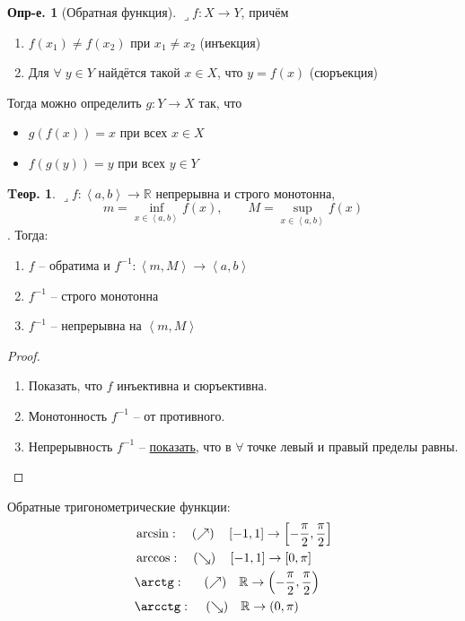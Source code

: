\documentclass[a4paper,12pt]{article}
\numberwithin{figure}{section}
\theoremstyle{definition}
\newtheorem{definition}{Опр-е.}[section]
\newtheorem{theorem}{Tеор.}[section]
\def\DS{\displaystyle}
\def\RR{\mathbb{R}}
\def\on{\!:}
\def\intab{\left<a,b\right>}
\def\lets{{\huge$\lrcorner$}\space}
\def\any{$\forall\;$}
\begin{document}
\begin{definition}[Обратная функция]
	\lets $f\on X\to Y$, причём\begin{enumerate}
		\item $f(x_1)\ne f(x_2)$ при $x_1\ne x_2$ (инъекция)
		\item Для \any $y\in Y$ найдётся такой $x\in X$, что $y=f(x)$ (сюръекция)
	\end{enumerate}
	Тогда можно определить $g\on Y\to X$ так, что\begin{itemize}
		\item $g(f(x))=x$ при всех $x\in X$
		\item $f(g(y))=y$ при всех $y\in Y$
	\end{itemize}
\end{definition}

\begin{theorem}
	\lets $f\on \intab\to\RR$ непрерывна и строго монотонна,
	\[ \DS m=\inf_{x \in \intab}f(x) ,\qquad \DS M=\sup_{x \in \intab}f(x)\].
	Тогда:
	\begin{enumerate}
		\item $f$ -- обратима и $f^{-1}\on \left<m,M\right> \to \intab$
		\item $f^{-1}$ -- строго монотонна
		\item $f^{-1}$ -- непрерывна на $\left<m,M\right>$
	\end{enumerate}
\end{theorem}
\begin{proof}
  \leavevmode
  \begin{enumerate}
	\item Показать, что $f$ инъективна и сюръективна.
	\item Монотонность $f^{-1}$ -- от противного.
	\item Непрерывность $f^{-1}$ -- \href{https://stepik.org/lesson/9530/step/6}{показать},
		  что в \any точке левый и правый пределы равны.
  \end{enumerate}
\end{proof}


Обратные тригонометрические функции:
\begin{align*}
	  & \arcsin:     \quad (\nearrow) \quad \left[ -1, 1 \right] \to \left[ -\frac\pi2, \frac\pi2 \right]
	\\& \arccos:     \quad (\searrow) \quad \left[ -1, 1 \right] \to \left[ 0, \pi \right]
	\\& \arctg: \;\; \quad (\nearrow) \quad \RR \to \left( -\frac\pi2, \frac\pi2 \right)
	\\& \arcctg:  \, \quad (\searrow) \quad \RR \to \left( 0, \pi \right)
\end{align*}
\end{document}
